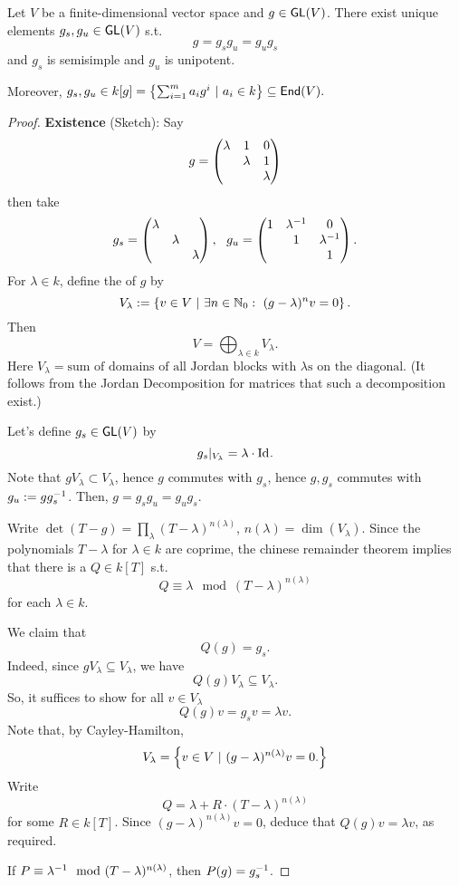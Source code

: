 \begin{proposition}
Let $V$ be a finite-dimensional vector space and $g \in \textsf{GL}(V)$. There exist unique elements $g_s, g_u \in \textsf{GL}(V)$ s.t.
\[ g = g_s g_u = g_u g_s \]
and $g_s$ is semisimple and $g_u$ is unipotent.

Moreover, $g_s, g_u \in k[g] = \left\lbrace\sum_{i=1}^m a_i g^i ~ | ~ a_i \in k\right\rbrace \subseteq \textsf{End}(V).$
\end{proposition}
\begin{proof}
\textbf{Existence} (Sketch): Say
\[ g = \left(\begin{matrix}  \lambda & 1 & 0\\ & \lambda & 1\\ & & \lambda \end{matrix}\right) \]
then take
\[ g_s = \left(\begin{matrix}  \lambda &  & \\ & \lambda & \\ & & \lambda \end{matrix}\right), ~~ g_u = \left(\begin{matrix}  1 & \lambda^{-1} & 0 \\ & 1 & \lambda^{-1} \\ & & 1 \end{matrix}\right). \]
For $\lambda \in k$, define the  of $g$ by
\[ V_\lambda := \left\lbrace v \in V ~ | ~ \exists n \in \mathbb{N}_0:~ (g-\lambda)^n v = 0  \right\rbrace. \]
Then
\[ V = \bigoplus_{\lambda \in k} V_\lambda. \]
Here $V_\lambda = \text{sum of domains of all Jordan blocks with }\lambda\text{s on the diagonal}.$ (It follows from the Jordan Decomposition for matrices that such a decomposition exist.)

Let's define $g_s \in \textsf{GL}(V)$ by
\[ g_s|_{V_\lambda} = \lambda \cdot \text{Id}_{}. \]
Note that $gV_\lambda \subset V_\lambda$, hence $g$ commutes with $g_s$, hence $g, g_s$ commutes with $g_u := gg_s^{-1}$. Then, $g = g_s g_u = g_ug_s$.


Write $\det(T- g) = \prod_\lambda (T-\lambda)^{n(\lambda)}$, $n(\lambda) = \dim (V_\lambda)$.
Since the polynomials $T-\lambda$ for $\lambda \in k$ are coprime, the chinese remainder theorem implies that there is a $Q \in k[T]$ s.t.
\[ Q \equiv  \lambda \mod (T-\lambda)^{n(\lambda)} \]
for each $\lambda \in k$.

We claim that
\[ Q(g) = g_s.  \]
Indeed, since $gV_\lambda \subseteq V_\lambda$, we have
\[ Q(g) V_\lambda \subseteq V_\lambda. \]
So, it suffices to show for all $v \in V_\lambda$
\[ Q(g)v =g_sv = \lambda v. \]
Note that, by Cayley-Hamilton,
\[ V_\lambda = \left\lbrace v \in V ~ | ~  (g-\lambda)^{n(\lambda)} v = 0. \right\rbrace \]
Write
\[ Q = \lambda + R \cdot (T-\lambda)^{n(\lambda)} \]
for some $R \in k[T]$.
Since $(g-\lambda)^{n(\lambda)}v = 0$, deduce that $Q(g)v = \lambda v$, as required.

If $P \equiv \lambda^{-1} \mod(T- \lambda)^{n(\lambda)}$, then $P(g) = g^{-1}_s$.


\end{proof}

